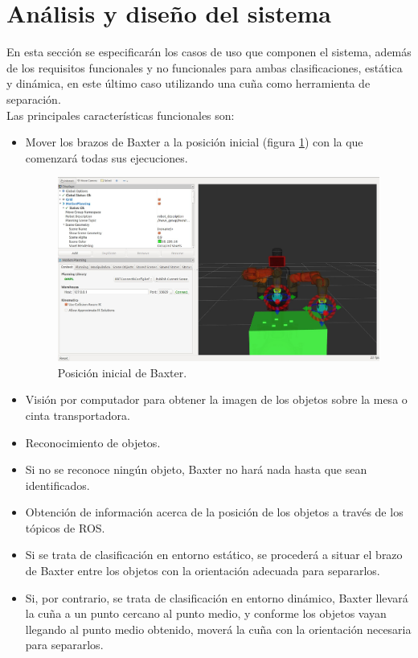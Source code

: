 \newpage
\section{Análisis y diseño del sistema}
\noindent En esta sección se especificarán los casos de uso que componen el sistema, además de los requisitos funcionales y no funcionales para ambas clasificaciones, estática y dinámica, en este último caso utilizando una cuña como herramienta de separación. \\

\noindent Las principales características funcionales son:
\begin{itemize}
	\item Mover los brazos de Baxter a la posición inicial (figura \ref{cd:ip}) con la que comenzará todas sus ejecuciones.
	\begin{figure}[!h]
		\label{cd:ip}
		\centering %
		\includegraphics[scale=0.22]{imagenes/initialpos.jpg}
		\caption{Posición inicial de Baxter.}
	\end{figure}
	\item Visión por computador para obtener la imagen de los objetos sobre la mesa o cinta transportadora.
	\item Reconocimiento de objetos.
	\item Si no se reconoce ningún objeto, Baxter no hará nada hasta que sean identificados.
	\item Obtención de información acerca de la posición de los objetos a través de los tópicos de ROS.
	\item Si se trata de clasificación en entorno estático, se procederá a situar el brazo de Baxter entre los objetos con la orientación adecuada para separarlos.
	\item Si, por contrario, se trata de clasificación en entorno dinámico, Baxter llevará la cuña a un punto cercano al punto medio, y conforme los objetos vayan llegando al punto medio obtenido, moverá la cuña con la orientación necesaria para separarlos.
\end{itemize}

